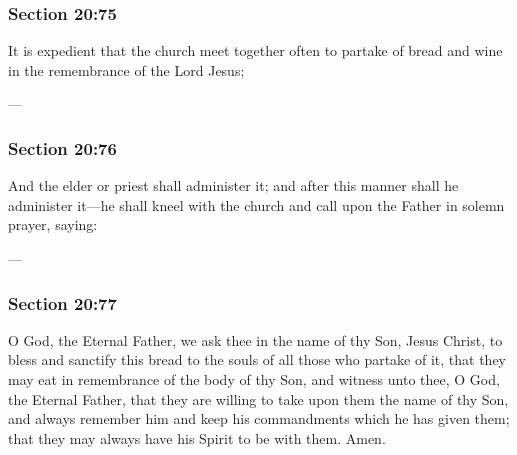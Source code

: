 	\subsubsection{Section 20:75} %
		\label{DC20-75}

		It is expedient that the church meet together often to partake of bread and wine in the remembrance of the Lord Jesus;

		\begin{framed}
		\scriptsize
			\begin{compactdesc}
				\item[JSP] ---
				\item[RB1] 
				\item[BC] 
			\end{compactdesc}
		\end{framed}

	\subsubsection{Section 20:76} %
		\label{DC20-76}

		And the elder or priest shall administer it; and after this manner shall he administer it---he shall kneel with the church and call upon the Father in solemn prayer, saying:

		\begin{framed}
		\scriptsize
			\begin{compactdesc}
				\item[JSP] ---
				\item[RB1] 
				\item[BC] 
			\end{compactdesc}
		\end{framed}

	\subsubsection{Section 20:77} %
		\label{DC20-77}

		O God, the Eternal Father, we ask thee in the name of thy Son, Jesus Christ, to bless and sanctify this bread to the souls of all those who partake of it, that they may eat in remembrance of the body of thy Son, and witness unto thee, O God, the Eternal Father, that they are willing to take upon them the name of thy Son, and always remember him and keep his commandments which he has given them; that they may always have his Spirit to be with them. Amen.

